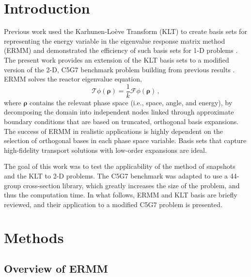 \documentclass[5p,times,twocolumn,10pt]{elsarticle}
\begin{document}
\section{Introduction}

Previous work used the Karhunen-Lo\`{e}ve Transform (KLT) to create
basis sets for representing the energy variable in the eigenvalue response 
matrix method (ERMM) and demonstrated the efficiency of such basis sets for 
1-D problems \cite{annualANS, reedThesis, reed2015energy}. 
 The present work provides an extension of the KLT basis sets to a modified version of
 the 2-D, C5G7 benchmark problem building from previous results \cite{winterANS}. ERMM solves the reactor eigenvalue equation,
\begin{equation}
  \mathcal{T} \phi(\bm{\rho}) = 
    \frac{1}{k} \mathcal{F} \phi(\bm{\rho}) \, ,
  \label{eq:global}
\end{equation}
where $\bm{\rho}$ contains the relevant phase space (i.e., space, angle, and 
energy),
by decomposing the domain into independent nodes linked through approximate  
boundary conditions that are based on truncated, orthogonal basis expansions.  
The 
success of ERMM in realistic applications is highly dependent on the 
selection of orthogonal bases in each phase space variable.  Basis 
sets that capture 
high-fidelity transport solutions with low-order expansions are ideal. 

The goal of this work was to test the applicability of the method of snapshots and 
the KLT to 2-D problems.  The C5G7 benchmark was adapted to use a 44-group 
cross-section library, which greatly increases the size of the problem, and 
thus the computation time.  In what follows, ERMM and KLT basis are briefly 
reviewed, and their application 
to a modified C5G7 problem is presented.

\section{Methods}
\subsection{Overview of ERMM}
\end{document}
